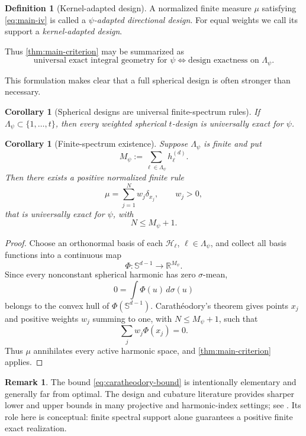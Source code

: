 \documentclass[12pt,a4paper]{article}
\newcommand{\Sph}{\mathbb S}
\newcommand{\R}{\mathbb R}
\newcommand{\Harm}{\mathcal H}
\theoremstyle{plain}
\newtheorem{corollary}[theorem]{Corollary}
\theoremstyle{definition}
\newtheorem{definition}[theorem]{Definition}
\newtheorem{remark}[theorem]{Remark}
\begin{document}
\begin{definition}[Kernel-adapted design]\label{def:kernel-adapted}
A normalized finite measure $\mu$ satisfying \eqref{eq:main-iv} is called a \emph{$\psi$-adapted directional design}.  For equal weights we call its support a \emph{kernel-adapted design}.
\end{definition}

Thus \cref{thm:main-criterion} may be summarized as
\begin{equation}\label{eq:main-slogan}
 \boxed{\quad
 \text{universal exact integral geometry for }\psi
 \iff
 \text{design exactness on }\Lambda_\psi.
 \quad}
\end{equation}

This formulation makes clear that a full spherical design is often stronger than necessary.

\begin{corollary}[Spherical designs are universal finite-spectrum rules]\label{cor:spherical-sufficient}
If $\Lambda_\psi\subset\{1,\ldots,t\}$, then every weighted spherical $t$-design is universally exact for $\psi$.
\end{corollary}

\begin{corollary}[Finite-spectrum existence]\label{cor:caratheodory}
Suppose $\Lambda_\psi$ is finite and put
\[
 M_\psi:=\sum_{\ell\in\Lambda_\psi}h_\ell^{(d)}.
\]
Then there exists a positive normalized finite rule
\[
 \mu=\sum_{j=1}^Nw_j\delta_{x_j},\qquad w_j>0,
\]
that is universally exact for $\psi$, with
\begin{equation}\label{eq:caratheodory-bound}
 N\le M_\psi+1.
\end{equation}
\end{corollary}

\begin{proof}
Choose an orthonormal basis of each $\Harm_\ell$, $\ell\in\Lambda_\psi$, and collect all basis functions into a continuous map
\[
 \Phi:\Sph^{d-1}\to\R^{M_\psi}.
\]
Since every nonconstant spherical harmonic has zero $\sigma$-mean,
\[
 0=\int\Phi(u)\,d\sigma(u)
\]
belongs to the convex hull of $\Phi(\Sph^{d-1})$.  Carath\'eodory's theorem gives points $x_j$ and positive weights $w_j$ summing to one, with $N\le M_\psi+1$, such that
\[
 \sum_jw_j\Phi(x_j)=0.
\]
Thus $\mu$ annihilates every active harmonic space, and \cref{thm:main-criterion} applies.
\end{proof}

\begin{remark}
The bound \eqref{eq:caratheodory-bound} is intentionally elementary and generally far from optimal.  The design and cubature literature provides sharper lower and upper bounds in many projective and harmonic-index settings; see \cite{BOT,ZhuEtAl,Lyubich2009}.  Its role here is conceptual: finite spectral support alone guarantees a positive finite exact realization.
\end{remark}
\end{document}
